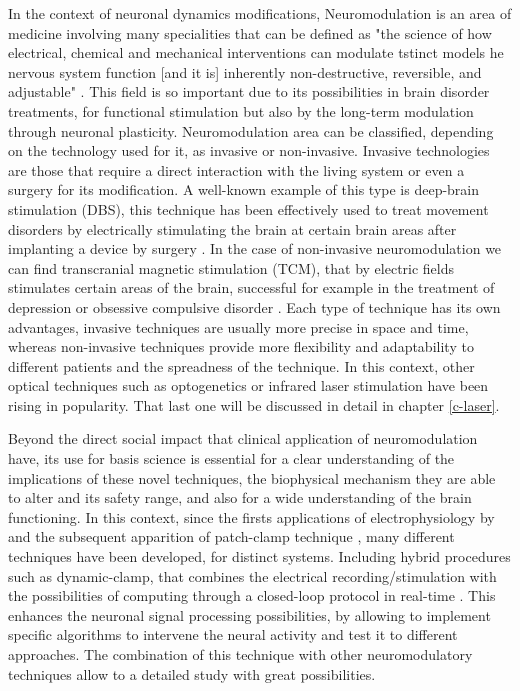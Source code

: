 In the context of neuronal dynamics modifications, Neuromodulation is an area of medicine involving many specialities that can be defined as "the science of how electrical, chemical and mechanical interventions can modulate tstinct models he nervous system function [and it is] inherently non-destructive, reversible, and adjustable" \parencite{krames_neuromodulation_2009}. This field is so important due to its possibilities in brain disorder treatments, for functional stimulation but also by the long-term modulation through neuronal plasticity. Neuromodulation area can be classified, depending on the technology used for it, as invasive or non-invasive. Invasive technologies are those that require a direct interaction with the living system or even a surgery for its modification. A well-known example of this type is deep-brain stimulation (DBS), this technique has been effectively used to treat movement disorders by electrically stimulating the brain at certain brain areas after implanting a device by surgery \parencite{limousin_long-term_2019, hariz_deep_2022}. In the case of non-invasive neuromodulation we can find transcranial magnetic stimulation (TCM), that by electric fields stimulates certain areas of the brain, successful for example in the treatment of depression or obsessive compulsive disorder \parencite{valero-cabre_transcranial_2017, clarke_patients_2018}. Each type of technique has its own advantages, invasive techniques are usually more precise in space and time, whereas non-invasive techniques provide more flexibility and adaptability to different patients and the spreadness of the technique. In this context, other optical techniques such as optogenetics or infrared laser stimulation have been rising in popularity. That last one will be discussed in detail in chapter \ref{c-laser}.

Beyond the direct social impact that clinical application of neuromodulation have, its use for basis science is essential for a clear understanding of the implications of these novel techniques, the biophysical mechanism they are able to alter and its safety range, and also for a wide understanding of the brain functioning. In this context, since the firsts applications of electrophysiology by \cite{neher_single-channel_1976} and the subsequent apparition of patch-clamp technique \cite{hamill_improved_1981}, many different techniques have been developed, for distinct systems. Including hybrid procedures such as dynamic-clamp, that combines the electrical recording/stimulation with the possibilities of computing through a closed-loop protocol in real-time \parencite{nowotny_dynamic_2022}. This enhances the neuronal signal processing possibilities, by allowing to implement specific algorithms to intervene the neural activity and test it to different approaches. The combination of this technique with other neuromodulatory techniques allow to a detailed study with great possibilities. 













